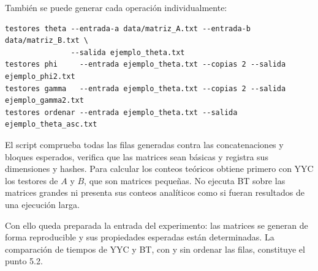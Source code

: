 También se puede generar cada operación individualmente:
\begin{Verbatim}[fontsize=\small, frame=single]
testores theta --entrada-a data/matriz_A.txt --entrada-b data/matriz_B.txt \
               --salida ejemplo_theta.txt
testores phi     --entrada ejemplo_theta.txt --copias 2 --salida ejemplo_phi2.txt
testores gamma   --entrada ejemplo_theta.txt --copias 2 --salida ejemplo_gamma2.txt
testores ordenar --entrada ejemplo_theta.txt --salida ejemplo_theta_asc.txt
\end{Verbatim}

El script comprueba todas las filas generadas contra las
concatenaciones y bloques esperados, verifica que las matrices
sean básicas y registra sus dimensiones y hashes. Para calcular
los conteos teóricos obtiene primero con YYC los testores de
$A$ y $B$, que son matrices pequeñas. No ejecuta BT sobre las
matrices grandes ni presenta sus conteos analíticos como si
fueran resultados de una ejecución larga.

Con ello queda preparada la entrada del experimento: las
matrices se generan de forma reproducible y sus propiedades
esperadas están determinadas. La comparación de tiempos de
YYC y BT, con y sin ordenar las filas, constituye el punto 5.2.
